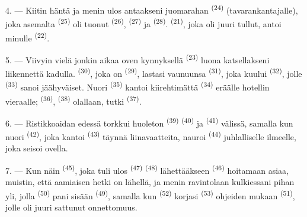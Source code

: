 4. --- Kiitin häntä ja menin ulos antaakseni juomarahan 
\textsuperscript{(24)} (tavarankantajalle), joka asemalta
 \textsuperscript{(25)} oli tuonut 
\textsuperscript{(26)},  \textsuperscript{(27)} ja
 \textsuperscript{(28)}. 
\textsuperscript{(21)}, joka oli juuri tullut, antoi minulle 
\textsuperscript{(22)}.

5. --- Viivyin vielä jonkin aikaa oven kynnyksellä 
\textsuperscript{(23)} luona katsellakseni liikennettä kadulla.
 \textsuperscript{(30)}, joka on 
\textsuperscript{(29)}, lastasi vaunuunsa 
\textsuperscript{(31)}, joka kuului 
\textsuperscript{(32)}, jolle  \textsuperscript{(33)}
sanoi jäähyväiset. Nuori  \textsuperscript{(35)}
kantoi kiirehtimättä  \textsuperscript{(34)} eräälle hotellin
vieraalle;  \textsuperscript{(36)}, 
\textsuperscript{(38)} olallaan, tutki 
\textsuperscript{(37)}.

\VUsaut{4.0mm}
\VUsaut{3.0mm}

6. --- Ristikkoaidan edessä torkkui huoleton 
\textsuperscript{(39)}  \textsuperscript{(40)} ja
 \textsuperscript{(41)} välissä, samalla kun nuori
 \textsuperscript{(42)}, joka kantoi 
\textsuperscript{(43)} täynnä liinavaatteita, nauroi 
\textsuperscript{(44)} juhlalliselle ilmeelle, joka seisoi ovella.

7. --- Kun näin  \textsuperscript{(45)}, joka tuli ulos
 \textsuperscript{(47)} 
\textsuperscript{(48)} lähettääkseen 
\textsuperscript{(46)} hoitamaan asiaa, muistin, että aamiaisen hetki on
lähellä, ja menin ravintolaan kulkiessani pihan yli, jolla
 \textsuperscript{(50)} pani sisään 
\textsuperscript{(49)}, samalla kun  \textsuperscript{(52)}
korjasi  \textsuperscript{(53)} ohjeiden mukaan
 \textsuperscript{(51)}, jolle oli juuri sattunut
onnettomuus.

